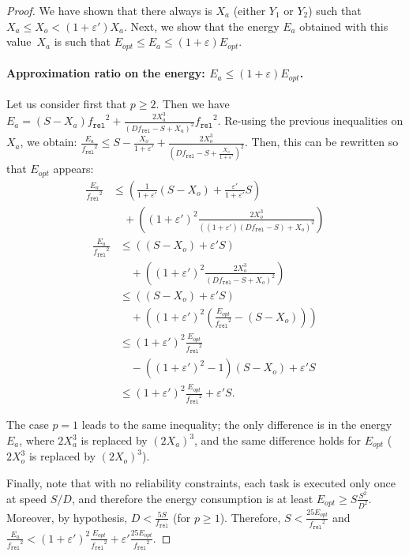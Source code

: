\documentclass[a4paper]{article}
\theoremstyle{plain}
\theoremstyle{definition}
\theoremstyle{remark}
\newcommand{\fr}{\ensuremath{f_{\texttt{rel}}}\xspace}
\begin{document}
\begin{proof}
We have shown that there always is $X_a$ (either $Y_1$ or $Y_2$) such
that $X_a\leq X_o <(1+\varepsilon')X_a$.  Next, we show that the
energy $E_a$ obtained with this value~$X_a$ is such that
$E_{opt}\leq E_a \leq (1+\varepsilon)E_{opt}$. 


\paragraph{Approximation ratio on the energy:  $E_a \leq (1+\varepsilon)E_{opt}$.} 



Let us consider first that $p\geq 2$. Then we have 
$E_a =   (S-X_a)\fr^2 + \frac{2X_a^3}{(D\fr-S+X_a)^2}\fr^2$.  
Re-using the previous inequalities on $X_a$, we obtain: 
$\frac{E_{a}}{\fr^2} \leq  S-\frac{X_o}{1+\varepsilon'}  +
\frac{2X_o^3}{(D\fr-S+\frac{X_o}{1+\varepsilon'})^2}$. 
Then, this can be rewritten so that $E_{opt}$ appears: 
\begin{align*}
\frac{E_{a}}{\fr^2} 
&\leq \left(\frac{1}{1+\varepsilon'}(S-X_o)+\frac{\varepsilon'}{1+\varepsilon'}S \right ) \\
& \quad {}+\left (
  (1+\varepsilon')^2\frac{2X_o^3}{((1+\varepsilon')(D\fr-S)+X_o)^2}
\right )
\end{align*}
\begin{align*}
\frac{E_{a}}{\fr^2} 
&\leq \left((S-X_o) + \varepsilon' S \right ) \\
& \quad{} + \left((1+\varepsilon')^2\frac{2X_o^3}{(D\fr-S+X_o)^2} \right ) \\
&\leq \left((S-X_o) + \varepsilon' S \right ) \\
& \quad{} + \left( (1+\varepsilon')^2(\frac{E_{opt}}{\fr^2} - (S-X_o)) \right )\\
&\leq (1+\varepsilon')^2 \frac{E_{opt}}{\fr^2} \\
& \quad{}- ((1+\varepsilon')^2 - 1 )(S-X_o) + \varepsilon' S \\
&\leq (1+\varepsilon')^2 \frac{E_{opt}}{\fr^2} + \varepsilon' S . 
\end{align*}

The case $p=1$ leads to the same inequality; the only difference is in
the energy~$E_a$, where $2X_a^3$ is replaced by $(2X_a)^3$, and the
same difference holds for $E_{opt}$ ($2X_o^3$ is replaced by
$(2X_o)^3$). 

Finally, note that with no reliability constraints, each task is
executed only once at speed $S/D$, and therefore the energy
consumption is at least $E_{opt}\geq S\frac{S^2}{D^2}$. Moreover, by
hypothesis, $D<\frac{5S}{\fr}$ (for $p\geq 1$). Therefore,
$S<\frac{25E_{opt}}{\fr^2}$ and $\frac{E_{a}}{\fr^2} < 
(1+\varepsilon')^2 \frac{E_{opt}}{\fr^2} + \varepsilon'
\frac{25E_{opt}}{\fr^2}$.



\end{proof}
\end{document}
